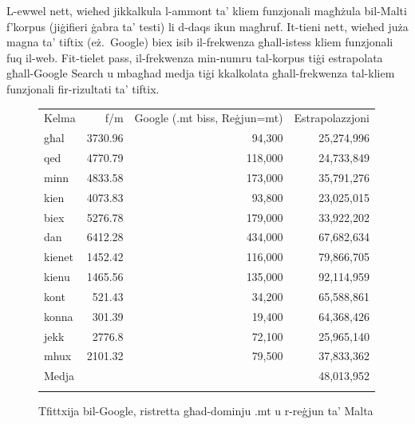 \begin{multicols}{2}

L-ewwel nett, wieħed jikkalkula l-ammont ta’ kliem funzjonali magħżula bil-Malti f’korpus (jiġifieri ġabra ta’ testi) li d-daqs ikun magħruf. It-tieni nett, wieħed juża magna ta’ tiftix (eż.~Google) biex isib il-frekwenza għall-istess kliem funzjonali fuq il-web. Fit-tielet pass, il-frekwenza min-numru tal-korpus tiġi estrapolata għall-Google Search u mbagħad medja tiġi kkalkolata għall-frekwenza tal-kliem funzjonali fir-rizultati ta’ tiftix.

\begin{figure}[p]
\setlength{\tabcolsep}{2.5em}
\begin{tabularx}{\textwidth}{lrrr} \toprule\addlinespace
Kelma  & f/m & Google (.mt biss, Reġjun=mt) & Estrapolazzjoni  \\ \addlinespace\midrule\addlinespace
għal & 3730.96 & 94,300 & 25,274,996 \\
qed	& 4770.79 & 118,000 & 24,733,849 \\
minn & 4833.58 & 173,000 & 35,791,276 \\
kien & 4073.83 & 93,800 & 23,025,015 \\
biex & 5276.78 & 179,000 & 33,922,202 \\
dan	& 6412.28 & 434,000 & 67,682,634 \\
kienet & 1452.42 & 116,000 & 79,866,705 \\
kienu & 1465.56 & 135,000 & 92,114,959 \\
kont & 521.43 & 34,200 & 65,588,861 \\
konna & 301.39 & 19,400 & 64,368,426 \\
jekk & 2776.8 & 72,100 & 25,965,140 \\
mhux & 2101.32 & 79,500 & 37,833,362 \\ \addlinespace\midrule\addlinespace
Medja & & & 48,013,952 \\ \addlinespace\bottomrule
\end{tabularx}
\caption{Tfittxija bil-Google, ristretta għad-dominju .mt u r-reġjun ta’ Malta}
\label{table:Google_A_mt}
\end{figure}


\end{multicols}
